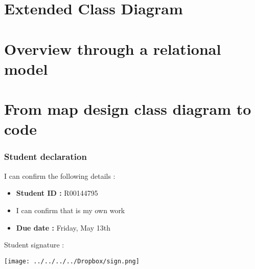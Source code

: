 \documentclass{report}
\begin{document}
\part{Extended Class Diagram}
\part{Overview through a relational model}
\part{From map design class diagram to code}


\section*{Student declaration}
I can confirm the following details :
\begin{itemize}
\item \textbf{Student ID :} R00144795
\item I can confirm that is my own work
\item \textbf{Due date :} Friday, May 13th
\end{itemize}

Student signature :

\texttt{[image: ../../../../Dropbox/sign.png]}
\end{document}
